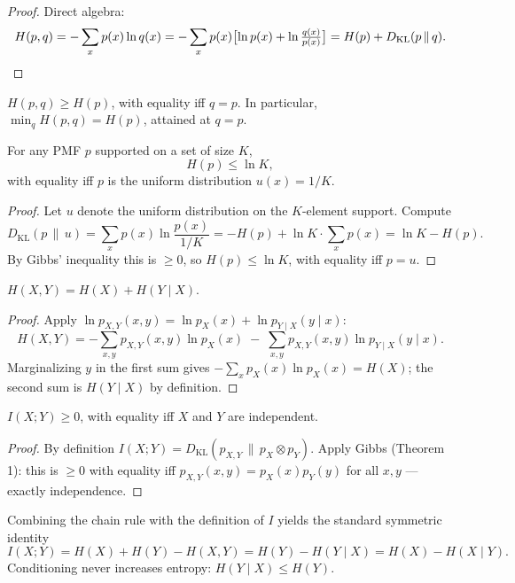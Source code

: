 \begin{proof}
Direct algebra:
\[
H(p, q) = -\sum_x p(x) \ln q(x) = -\sum_x p(x) \bigl[\ln p(x) + \ln \tfrac{q(x)}{p(x)}\bigr] = H(p) + D_{\mathrm{KL}}(p \,\|\, q). \qedhere
\]
\end{proof}

\begin{corollary}
$H(p, q) \geq H(p)$, with equality iff $q = p$. In particular, $\min_q H(p, q) = H(p)$, attained at $q = p$.
\end{corollary}

\begin{theorem}
For any PMF $p$ supported on a set of size $K$,
\[
H(p) \leq \ln K,
\]
with equality iff $p$ is the uniform distribution $u(x) = 1/K$.
\end{theorem}

\begin{proof}
Let $u$ denote the uniform distribution on the $K$-element support. Compute
\[
D_{\mathrm{KL}}(p \,\|\, u) = \sum_x p(x) \ln \frac{p(x)}{1/K} = -H(p) + \ln K \cdot \sum_x p(x) = \ln K - H(p).
\]
By Gibbs' inequality this is $\geq 0$, so $H(p) \leq \ln K$, with equality iff $p = u$.
\end{proof}

\begin{theorem}
$H(X, Y) = H(X) + H(Y \mid X).$
\end{theorem}

\begin{proof}
Apply $\ln p_{X,Y}(x, y) = \ln p_X(x) + \ln p_{Y \mid X}(y \mid x)$:
\[
H(X, Y) = -\sum_{x,y} p_{X,Y}(x,y) \ln p_X(x) \;-\; \sum_{x,y} p_{X,Y}(x,y) \ln p_{Y \mid X}(y \mid x).
\]
Marginalizing $y$ in the first sum gives $-\sum_x p_X(x) \ln p_X(x) = H(X)$; the second sum is $H(Y \mid X)$ by definition.
\end{proof}

\begin{theorem}
$I(X; Y) \geq 0$, with equality iff $X$ and $Y$ are independent.
\end{theorem}

\begin{proof}
By definition $I(X; Y) = D_{\mathrm{KL}}(p_{X,Y} \,\|\, p_X \otimes p_Y)$. Apply Gibbs (Theorem 1): this is $\geq 0$ with equality iff $p_{X,Y}(x, y) = p_X(x) p_Y(y)$ for all $x, y$ --- exactly independence.
\end{proof}

\begin{remark}
Combining the chain rule with the definition of $I$ yields the standard symmetric identity
\[
I(X; Y) = H(X) + H(Y) - H(X, Y) = H(Y) - H(Y \mid X) = H(X) - H(X \mid Y).
\]
Conditioning never increases entropy: $H(Y \mid X) \leq H(Y)$.
\end{remark}

